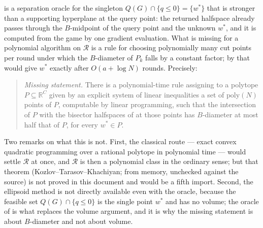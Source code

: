 \begin{remark}\label{hz:gap}
 is a separation oracle for the singleton
$Q(G)\cap\{q\le0\}=\{w^\ast\}$ that is stronger than a supporting hyperplane
at the query point: the returned halfspace already passes through the
$B$-midpoint of the query point and the unknown $w^{\ast}$, and it is
computed from the game by one gradient evaluation. What is missing for a
polynomial algorithm on $\mathcal R$ is a rule for choosing polynomially many
cut points per round under which the $B$-diameter of $P_k$ falls by a constant
factor; by  that would give $w^{\ast}$ exactly after
$O(a+\log N)$ rounds. Precisely:
\begin{quote}
\emph{Missing statement.} There is a polynomial-time rule assigning to a
polytope $P\subseteq\mathbb R^{C}$ given by an explicit system of linear
inequalities a set of $\mathrm{poly}(N)$ points of $P$, computable by linear
programming, such that the intersection of $P$ with the bisector halfspaces of
 at those points has $B$-diameter at most half that of $P$,
for every $w^{\ast}\in P$.
\end{quote}
Two remarks on what this is not. First, the classical route --- exact convex
quadratic programming over a rational polytope in polynomial time --- would
settle $\mathcal R$ at once, and $\mathcal R$ is then a polynomial class in the
ordinary sense; but that theorem (Kozlov--Tarasov--Khachiyan; from memory,
unchecked against the source) is not proved in this document and would be a
fifth import. Second, the ellipsoid method is not directly available even with
the oracle, because the feasible set $Q(G)\cap\{q\le0\}$ is the single point
$w^{\ast}$ and has no volume; the oracle of  is what
replaces the volume argument, and it is why the missing statement is about
$B$-diameter and not about volume.
\end{remark}

